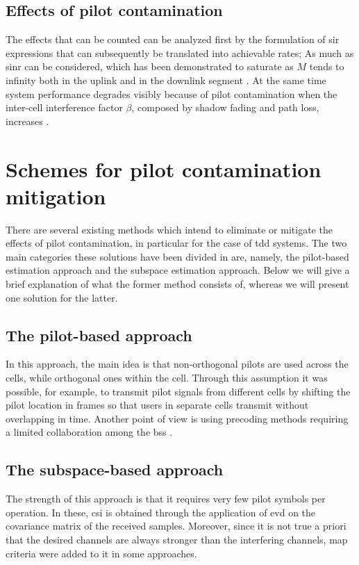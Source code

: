 \documentclass[11pt]{book}
\begin{document}
\subsection{Effects of pilot contamination}
The effects that can be counted can be analyzed first by the formulation of \gls{sir} expressions that can subsequently be translated into achievable rates; As much as \gls{sinr} can be considered, which has been demonstrated to saturate as $M$ tends to infinity both in the uplink and in the downlink segment \cite{Elijah2016} \cite{Buzzi}. At the same time system performance degrades visibly because of pilot contamination when the inter-cell interference factor $\beta$, composed by shadow fading and path loss, increases \cite{Elijah2016}.

\section{Schemes for pilot contamination mitigation}
There are several existing methods which intend to eliminate or mitigate the effects of pilot contamination, in particular for the case of \gls{tdd} systems. The two main categories these solutions have been divided in are, namely, the pilot-based estimation approach and the subspace estimation approach. Below we will give a brief explanation of what the former method consists of, whereas we will present one solution for the latter.

\subsection{The pilot-based approach}
In this approach, the main idea is that non-orthogonal pilots are used across the cells, while orthogonal ones within the cell. Through this assumption it was possible, for example, to transmit pilot signals from different cells by shifting the pilot location in frames so that users in separate cells transmit without overlapping in time. Another point of view is using precoding methods requiring a limited collaboration among the \gls{bs}s \cite{Elijah2016}.

\subsection{The subspace-based approach}
The strength of this approach is that it requires very few pilot symbols per operation. In these, \gls{csi} is obtained through the application of \gls{evd} on the covariance matrix of the received samples. Moreover, since it is not true a priori that the desired channels are always stronger than the interfering channels, \gls{map} criteria were added to it in some approaches.
\end{document}
